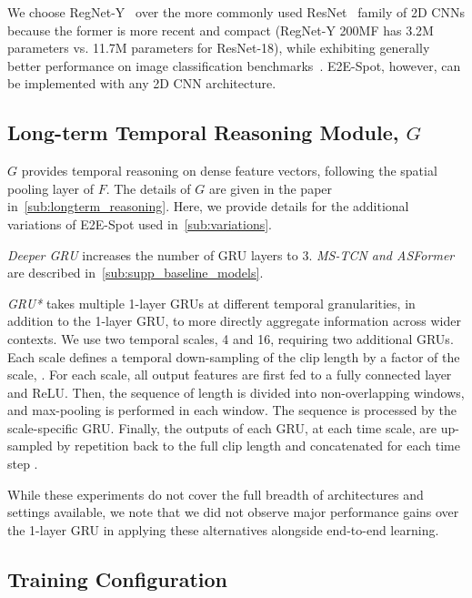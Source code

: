 \documentclass[runningheads]{llncs}
\newcommand{\notation}[1]{\ensuremath{#1}\xspace}
\newcommand{\OURMETHOD}{{E2E-Spot}\xspace}
\newcommand{\FeatureExtractor}{\notation{F}}
\newcommand{\TemporalArchitecture}{\notation{G}}
\begin{document}
We choose RegNet-Y~\cite{regnet} over the more commonly used ResNet~\cite{resnet} family of 2D CNNs because the former is more recent and compact (RegNet-Y 200MF has 3.2M parameters vs. 11.7M parameters for ResNet-18), while exhibiting generally better performance on image classification benchmarks~\cite{timm}.
\OURMETHOD, however, can be implemented with any 2D CNN architecture.

\subsection{Long-term Temporal Reasoning Module, \TemporalArchitecture}

\TemporalArchitecture provides temporal reasoning on dense feature vectors, following the spatial pooling layer of \FeatureExtractor.
The details of \TemporalArchitecture are given in the paper in~\autoref{sub:longterm_reasoning}.
Here, we provide details for the additional variations of \OURMETHOD used in~\autoref{sub:variations}.

\textit{Deeper GRU} increases the number of GRU layers to 3.
\textit{MS-TCN and ASFormer} are described in~\autoref{sub:supp_baseline_models}.

\textit{GRU*} takes multiple 1-layer GRUs at different temporal granularities, in addition to the 1-layer GRU, to more directly aggregate information across wider contexts.
We use two temporal scales, 4 and 16, requiring two additional GRUs.
Each scale defines a temporal down-sampling of the clip length by a factor of the scale, .
For each scale, all output features are first fed to a fully connected layer and ReLU. Then, the sequence of length  is divided into  non-overlapping windows, and max-pooling is performed in each window.
The  sequence is processed by the scale-specific GRU.
Finally, the outputs of each GRU, at each time scale, are up-sampled by repetition back to the full clip length  and concatenated for each time step .

While these experiments do not cover the full breadth of architectures and settings available, we note that we did not observe major performance gains over the 1-layer GRU in applying these alternatives alongside end-to-end learning.

\subsection{Training Configuration}
\end{document}

